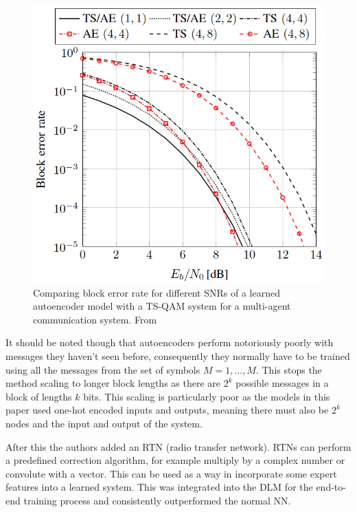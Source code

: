 \documentclass[12pt,onecolumn,letterpaper]{article}
\newcommand\genfigsize{0.5}
\begin{document}
\begin{figure}[t]
   \centering
   \includegraphics[width=\genfigsize\linewidth]{figures/oShea_autoencoder_TS_QAM.PNG}
   \caption{Comparing block error rate for different SNRs of a learned autoencoder model with a TS-QAM system for a multi-agent communication system. From~\cite{oShea}}
\label{fig:oSheaAutoencoderTsQam}
\end{figure}

It should be noted though that autoencoders perform notoriously poorly with messages they haven't seen before, consequently they normally have to be trained using all the messages from the set of symbols $M = {1,...,M}$. This stops the method scaling to longer block lengths as there are $2^k$ possible messages in a block of lengths $k$ bits. This scaling is particularly poor as the models in this paper used one-hot encoded inputs and outputs, meaning there must also be $2^k$ nodes and the input and output of the system.

After this the authors added an RTN (radio transfer network). RTNs can perform a predefined correction algorithm, for example multiply by a complex number or convolute with a vector. This can be used as a way in incorporate some expert features into a learned system. This was integrated into the DLM for the end-to-end training process and consistently outperformed the normal NN. 
\end{document}
